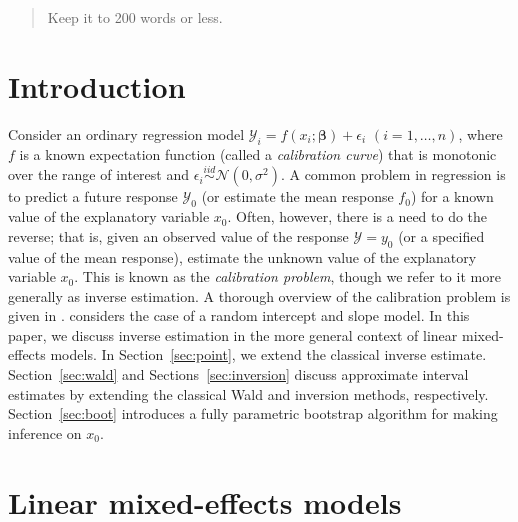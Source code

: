 \documentclass{article}\usepackage[]{graphicx}\usepackage[]{color}
\begin{document}

\begin{abstract}
Keep it to 200 words or less.
\end{abstract}



\section{Introduction}

Consider an ordinary regression model $\mathcal{Y}_i = f\left(x_i; \bm{\beta} \right) + \epsilon_i$ $(i = 1, \dotsc, n)$, where $f$ is a known expectation function (called a \emph{calibration curve}) that is monotonic over the range of interest and $\epsilon_i \stackrel{iid}{\sim} \mathcal{N}\left( 0, \sigma^2 \right)$.  A common problem in regression is to predict a future response $\mathcal{Y}_0$ (or estimate the mean response $f_0$) for a known value of the explanatory variable $x_0$.  Often, however, there is a need to do the reverse; that is, given an observed value of the response $\mathcal{Y} = y_0$ (or a specified value of the mean response), estimate the unknown value of the explanatory variable $x_0$.  This is known as the \emph{calibration problem}, though we refer to it more generally as inverse estimation.  A thorough overview of the calibration problem is given in \citet{osborne-statistical-1991}.  \citet{oman-calibration-1998} considers the case of a random intercept and slope model. In this paper, we discuss inverse estimation in the more general context of linear mixed-effects models. In Section~\ref{sec:point}, we extend the classical inverse estimate. Section~\ref{sec:wald} and Sections~\ref{sec:inversion} discuss approximate interval estimates by extending the classical Wald and inversion methods, respectively. Section~\ref{sec:boot} introduces a fully parametric bootstrap algorithm for making inference on $x_0$. 



\section{Linear mixed-effects models}
\end{document}

